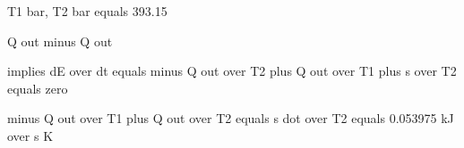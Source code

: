 T1 bar, T2 bar equals 393.15

Q out minus Q out

implies dE over dt equals minus Q out over T2 plus Q out over T1 plus s over T2 equals zero

minus Q out over T1 plus Q out over T2 equals s dot over T2 equals 0.053975 kJ over s K